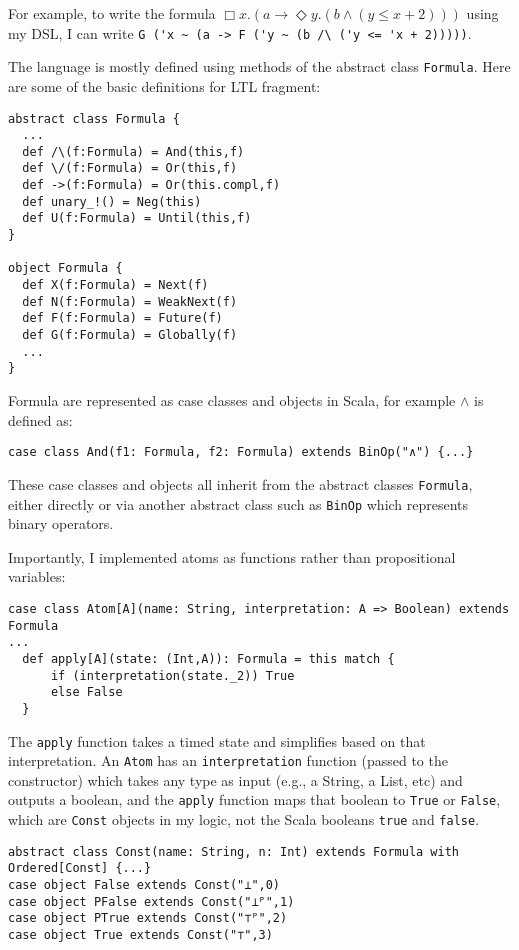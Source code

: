 \documentclass[a4paper]{article}
\begin{document}
For example, to write the formula $\Box x. (a \to \Diamond y. (b \land (y \leq x + 2)))$ using my DSL, I can write \lstinline{G ('x ~ (a -> F ('y ~ (b /\ ('y <= 'x + 2)))))}.

The language is mostly defined using methods of the abstract class \lstinline{Formula}. Here are some of the basic definitions for LTL fragment:
\begin{lstlisting}[label=lstbasic]
abstract class Formula {
  ...
  def /\(f:Formula) = And(this,f)
  def \/(f:Formula) = Or(this,f)
  def ->(f:Formula) = Or(this.compl,f)
  def unary_!() = Neg(this)
  def U(f:Formula) = Until(this,f)
}

object Formula {
  def X(f:Formula) = Next(f)
  def N(f:Formula) = WeakNext(f)
  def F(f:Formula) = Future(f)
  def G(f:Formula) = Globally(f)
  ...
}
\end{lstlisting}
Formula are represented as case classes and objects in Scala, for example $\land$ is defined as:
\begin{lstlisting}
case class And(f1: Formula, f2: Formula) extends BinOp("∧") {...}
\end{lstlisting}
These case classes and objects all inherit from the abstract classes \lstinline{Formula}, either directly or via another abstract class such as \lstinline{BinOp} which represents binary operators.

Importantly, I implemented atoms as functions rather than propositional variables:
\begin{lstlisting}
case class Atom[A](name: String, interpretation: A => Boolean) extends Formula
...
  def apply[A](state: (Int,A)): Formula = this match {
      if (interpretation(state._2)) True
      else False
  }
\end{lstlisting}

The \texttt{apply} function takes a timed state and simplifies based on that interpretation. An \texttt{Atom} has an \texttt{interpretation} function (passed to the constructor) which takes any type as input (e.g., a String, a List, etc) and outputs a boolean, and the \texttt{apply} function maps that boolean to \texttt{True} or \texttt{False}, which are \texttt{Const} objects in my logic, not the Scala booleans \texttt{true} and \texttt{false}.
\begin{lstlisting}
abstract class Const(name: String, n: Int) extends Formula with Ordered[Const] {...}
case object False extends Const("⊥",0)
case object PFalse extends Const("⊥ᴾ",1)
case object PTrue extends Const("⊤ᴾ",2)
case object True extends Const("⊤",3)
\end{lstlisting}
\end{document}

